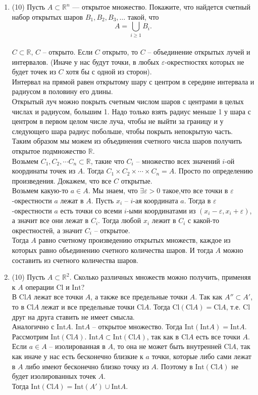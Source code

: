 \documentclass[a4paper]{article}
\def\eps{\varepsilon}
\def\Int{\mathrm{Int}}
\def\Cl{\mathrm{Cl}}
\begin{document}
\begin{enumerate}
    \item (10) Пусть $A\subset \mathbb R^n$ --- открытое множество. Покажите, что найдется счетный набор открытых шаров $B_1,B_2,B_3,\dots$ такой, что
    \[
        A = \bigcup_{i\geq 1} B_i.
    \]\\
    $C\subset \mathbb R$, $C$ -- открыто. Если $C$ открыто, то $C$ -- объединение открытых лучей и интервалов. (Иначе у нас будут точки, в любых $\eps$-окрестностях которых не будет точек из $C$ хотя бы с одной из сторон).\\
    Интервал на прямой равен открытому шару с центром в середине интервала и радиусом в половину его длины.\\
    Открытый луч можно покрыть счетным числом шаров с центрами в целых числах и радиусом, большим 1. Надо только взять радиус меньше 1 у шара с центром в первом целом числе луча, чтобы не выйти за границу и у следующего шара радиус побольше, чтобы покрыть непокрытую часть.\\
    Таким образом мы можем из объединения счетного числа шаров получить открытое подмножество $\mathbb R$.\\
    Возьмем $C_1, C_2, \cdots C_n \subset \mathbb R$, такие что $C_i$ -- множество всех значений $i$-ой координаты точек из $A$. Тогда $C_1\times C_2\times \cdots\times C_n = A$. Просто по определению произведения. Докажем, что все $C$ открытые.\\
    Возьмем какую-то $a \in A$. Мы знаем, что $\exists \eps > 0$ такое,что все точки в $\eps$-окрестности $a$ лежат в $A$. Пусть $x_i$ -- $i$-ая координата $a$. Тогда в $\eps$-окрестности $a$ есть точки со всеми $i$-ыми координатами из $(x_i-\eps, x_i+\eps)$, а значит все они лежат в $C_i$. Тогда любой $x_i$ лежит в $C_i$ с какой-то окрестностей, а значит $C_i$ -- открытое.\\
    Тогда $A$ равно счетному произведению открытых множеств, каждое из которых равно объединению счетного количества шаров. И тогда $A$ можно составить из счетного количества шаров.
    
    \item (10) Пусть $A\subset \mathbb R^2$. Сколько различных множеств можно получить, применяя к $A$ операции $\Cl$ и $\Int$?\\
    В $\Cl A$ лежат все точки $A$, а также все предельные точки $A$. Так как $A'' \subset A'$, то в $\Cl A$ лежат и все предельные точки $\Cl A$. Тогда $\Cl(\Cl A) = \Cl A$, т.е. $\Cl$ друг на друга ставить не имеет смысла.\\
    Аналогично с $\Int A$. $\Int A$ -- открытое множество. Тогда $\Int(\Int A) = \Int A$.\\
    Рассмотрим $\Int(\Cl A)$. $\Int A \subset \Int(\Cl A)$, так как в $\Cl A$ есть все точки $A$.\\
    Если $a \in A$ -- изолированная в $A$, то она не может быть внутренней $\Cl A$, так как иначе у нас есть бесконечно близкие к $a$ точки, которые либо сами лежат в $A$ либо имеют бесконечно близко точку из $A$. Поэтому в $\Int(\Cl A)$ не будет изолированных точек $A$.\\
    Тогда $\Int(\Cl A) = \Int (A') \cup \Int A$.    
    

\end{enumerate}
\end{document}
